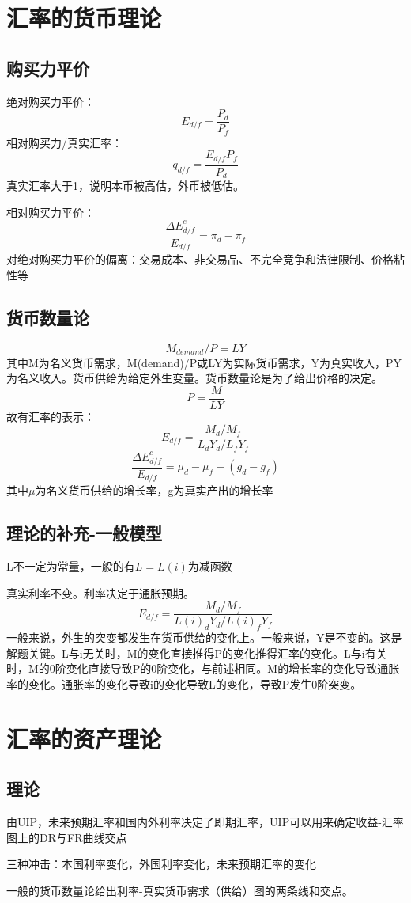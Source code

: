 \documentclass[a4paper, 10pt]{article}
\begin{document}
\section{汇率的货币理论}
\subsection{购买力平价}
绝对购买力平价：
$$E_{d/f}=\frac{P_d}{P_f}$$
相对购买力/真实汇率：
$$q_{d/f}=\frac{E_{d/f}P_f}{P_d}$$
真实汇率大于1，说明本币被高估，外币被低估。


\noindent 相对购买力平价：
$$\frac{\Delta E^e_{d/f}}{E_{d/f}}=\pi_d-\pi_f$$
对绝对购买力平价的偏离：交易成本、非交易品、不完全竞争和法律限制、价格粘性等
\subsection{货币数量论}
$$M_{demand}/P=LY$$
其中M为名义货币需求，M(demand)/P或LY为实际货币需求，Y为真实收入，PY为名义收入。货币供给为给定外生变量。货币数量论是为了给出价格的决定。
$$P=\frac{M}{LY}$$
故有汇率的表示：
$$E_{d/f}=\frac{M_d/M_f}{L_dY_d/L_fY_f}$$
$$\frac{\Delta E^e_{d/f}}{E_{d/f}}=\mu_d-\mu_f-(g_d-g_f)$$
其中$\mu$为名义货币供给的增长率，g为真实产出的增长率

\subsection{理论的补充-一般模型}
\noindent L不一定为常量，一般的有$L=L(i)$为减函数

\noindent 真实利率不变。利率决定于通胀预期。
$$E_{d/f}=\frac{M_d/M_f}{L(i)_dY_d/L(i)_fY_f}$$
一般来说，外生的突变都发生在货币供给的变化上。一般来说，Y是不变的。这是解题关键。L与i无关时，M的变化直接推得P的变化推得汇率的变化。L与i有关时，M的0阶变化直接导致P的0阶变化，与前述相同。M的增长率的变化导致通胀率的变化。通胀率的变化导致i的变化导致L的变化，导致P发生0阶突变。
\section{汇率的资产理论}
\subsection{理论}
\noindent 由UIP，未来预期汇率和国内外利率决定了即期汇率，UIP可以用来确定收益-汇率图上的DR与FR曲线交点

\noindent 三种冲击：本国利率变化，外国利率变化，未来预期汇率的变化

\noindent 一般的货币数量论给出利率-真实货币需求（供给）图的两条线和交点。
\end{document}
